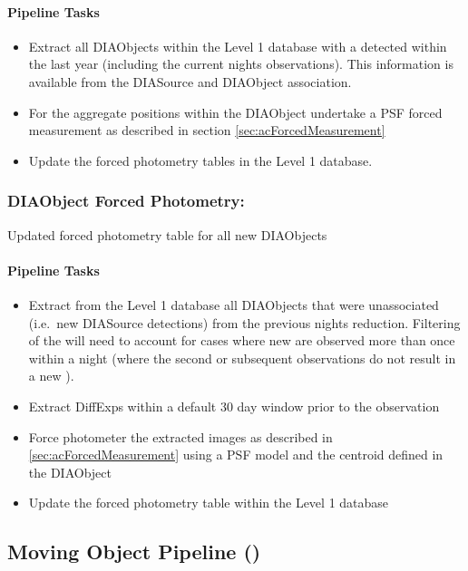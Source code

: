 \paragraph{Pipeline Tasks}

\begin{itemize}
\item Extract all DIAObjects within the Level 1 database with a detected \DIASource within the last year (including the current nights observations). This information is available from the DIASource and DIAObject association.  
\item For the aggregate positions within the DIAObject undertake a PSF forced measurement as described in section \ref{sec:acForcedMeasurement}
\item Update the forced photometry tables in the Level 1 database.
\end{itemize}



\subsubsection{DIAObject Forced Photometry:} 

Updated forced photometry table for all new DIAObjects


\paragraph{Pipeline Tasks}

\begin{itemize}
\item Extract from the Level 1 database all DIAObjects that were unassociated (i.e.\ new DIASource detections) from the previous nights reduction. Filtering of the \DIAObjects will need to account for cases where new \DIASources are observed more than once within a night (where the second or subsequent observations do not result in a new \DIAObject).
\item Extract DiffExps within a  default 30 day window prior to the observation
\item Force photometer the extracted images as described in \ref{sec:acForcedMeasurement} using a PSF model and the centroid defined in the DIAObject
\item Update the forced photometry table within the Level 1 database
\end{itemize}
\clearpage



\subsection{Moving Object Pipeline (\wbsMOPS)}

